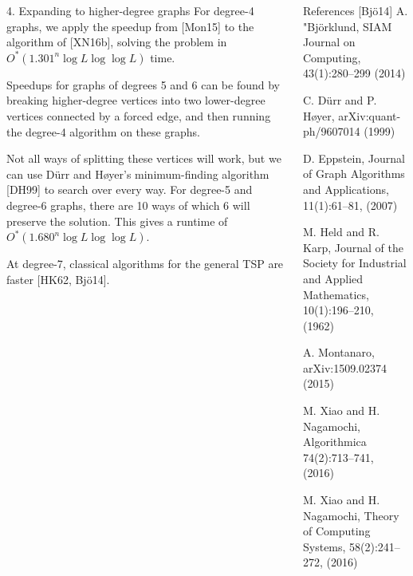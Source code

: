 \documentclass[]{templates/poster}
\begin{document}
\begin{frame}{}
\begin{columns}[t]
\begin{column}{0.422\linewidth}
\begin{block}{\Large 4. Expanding to higher-degree graphs}
  For degree-4 graphs, we apply the speedup from [Mon15] to the algorithm of [XN16b], solving the problem in $O^*(1.301^n\log L \log\log L)$ time.
  
  Speedups for graphs of degrees 5 and 6 can be found by breaking higher-degree vertices into two lower-degree vertices connected by a forced edge, and then running the degree-4 algorithm on these graphs.
  
  Not all ways of splitting these vertices will work, but we can use D\"urr and H\o yer's minimum-finding algorithm [DH99] to search over every way. For degree-5 and degree-6 graphs, there are 10 ways of which 6 will preserve the solution. This gives a runtime of $O^*(1.680^n\log L\log\log L)$.

  At degree-7, classical algorithms for the general TSP are faster [HK62, Bj\"o14].
  \end{block}
  \end{column}

  \begin{column}{0.422\linewidth}
  \begin{block}{\Large References}
  [Bj\"o14] A. "Bj{\"o}rklund, SIAM Journal on Computing, 43(1):280--299 (2014)

  \noindent[DH99] C. D\"urr and P. H\o yer, arXiv:quant-ph/9607014 (1999)

  \noindent[Epp07] D. Eppstein, Journal of Graph Algorithms and Applications, 11(1):61--81, (2007)

  \noindent[HK62] M. Held and R. Karp, Journal of the Society for Industrial and Applied Mathematics, 10(1):196--210, (1962)

  \noindent[Mon15] A. Montanaro, arXiv:1509.02374 (2015)

  \noindent[XN16a] M. Xiao and H. Nagamochi, Algorithmica 74(2):713--741, (2016)

  \noindent[XN16b] M. Xiao and H. Nagamochi, Theory of Computing Systems, 58(2):241--272, (2016)
  \end{block}
  \end{column}
\end{columns}

\end{frame}

\end{document}
